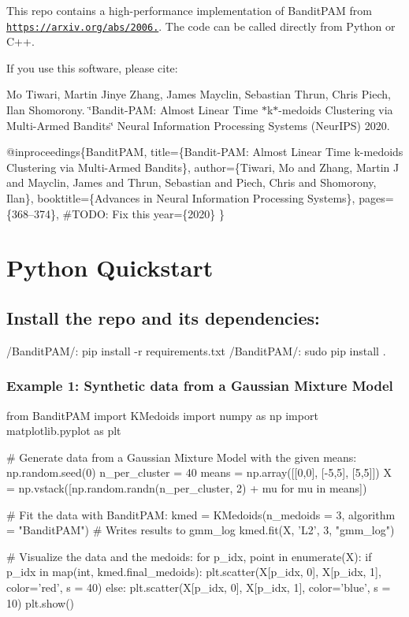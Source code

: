 This repo contains a high-\/performance implementation of Bandit\+P\+AM from \href{https://arxiv.org/abs/2006.06856}{\tt https\+://arxiv.\+org/abs/2006.}. The code can be called directly from Python or C++.

If you use this software, please cite\+:

Mo Tiwari, Martin Jinye Zhang, James Mayclin, Sebastian Thrun, Chris Piech, Ilan Shomorony. \char`\"{}\+Bandit-\/\+P\+A\+M\+: Almost Linear Time $\ast$k$\ast$-\/medoids Clustering via Multi-\/\+Armed Bandits\char`\"{} Neural Information Processing Systems (Neur\+I\+PS) 2020.


\begin{DoxyCode}
@inproceedings\{BanditPAM,
  title=\{Bandit-PAM: Almost Linear Time k-medoids Clustering via Multi-Armed Bandits\},
  author=\{Tiwari, Mo and Zhang, Martin J and Mayclin, James and Thrun, Sebastian and Piech, Chris and
       Shomorony, Ilan\},
  booktitle=\{Advances in Neural Information Processing Systems\},
  pages=\{368--374\}, #TODO: Fix this
  year=\{2020\}
\}
\end{DoxyCode}


\section*{Python Quickstart}

\subsection*{Install the repo and its dependencies\+:}


\begin{DoxyCode}
/BanditPAM/: pip install -r requirements.txt
/BanditPAM/: sudo pip install .
\end{DoxyCode}


\subsubsection*{Example 1\+: Synthetic data from a Gaussian Mixture Model}


\begin{DoxyCode}
from BanditPAM import KMedoids
import numpy as np
import matplotlib.pyplot as plt

# Generate data from a Gaussian Mixture Model with the given means:
np.random.seed(0)
n\_per\_cluster = 40
means = np.array([[0,0], [-5,5], [5,5]])
X = np.vstack([np.random.randn(n\_per\_cluster, 2) + mu for mu in means])

# Fit the data with BanditPAM:
kmed = KMedoids(n\_medoids = 3, algorithm = "BanditPAM")
# Writes results to gmm\_log
kmed.fit(X, 'L2', 3, "gmm\_log")

# Visualize the data and the medoids:
for p\_idx, point in enumerate(X):
    if p\_idx in map(int, kmed.final\_medoids):
        plt.scatter(X[p\_idx, 0], X[p\_idx, 1], color='red', s = 40)
    else:
        plt.scatter(X[p\_idx, 0], X[p\_idx, 1], color='blue', s = 10)
plt.show()
\end{DoxyCode}




